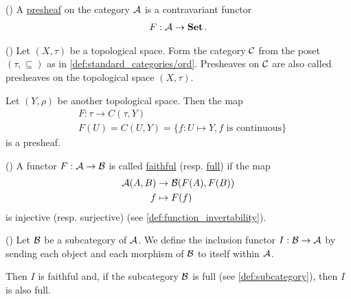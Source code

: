 \begin{definition}\label{def:presheaf}(\cite[definition 1.2.15]{Leinster2014})
  A \uline{presheaf} on the category $\mathcal A$ is a contravariant functor
  \begin{align*}
    F: \mathcal A \to \operatorname{\bold{Set}}.
  \end{align*}
\end{definition}

\begin{example}\label{ex:topological_space_presheaf}(\cite[24]{Leinster2014})
  Let $(X, \tau)$ be a topological space. Form the category $\mathcal C$ from the poset $(\tau, \subseteq)$ as in \cref{def:standard_categories/ord}. Presheaves on $\mathcal C$ are also called presheaves on the topological space $(X, \tau)$.

  Let $(Y, \rho)$ be another topological space. Then the map
  \begin{align*}
    &F: \tau \to C(\tau, Y) \\
    &F(U) = C(U, Y) = \{ f: U \mapsto Y, f \text{ is continuous} \}
  \end{align*}
  is a presheaf.
\end{example}

\begin{definition}\label{def:faithful_full_functors}(\cite[definition 1.2.16]{Leinster2014})
  A functor $F: \mathcal A \to \mathcal B$ is called \uline{faithful} (resp. \uline{full}) if the map
  \begin{align*}
    \mathcal A(A, B) &\to \mathcal B(F(A), F(B)) \\
    f &\mapsto F(f)
  \end{align*}
  is injective (resp. surjective) (see \cref{def:function_invertability}).
\end{definition}

\begin{example}\label{def:subcategory_functors}(\cite[25]{Leinster2014})
  Let $\mathcal B$ be a subcategory of $\mathcal A$. We define the inclusion functor $I: \mathcal B \to \mathcal A$ by sending each object and each morphism of $\mathcal B$ to itself within $\mathcal A$.

  Then $I$ is faithful and, if the subcategory $\mathcal B$ is full (see \cref{def:subcategory}), then $I$ is also full.
\end{example}
